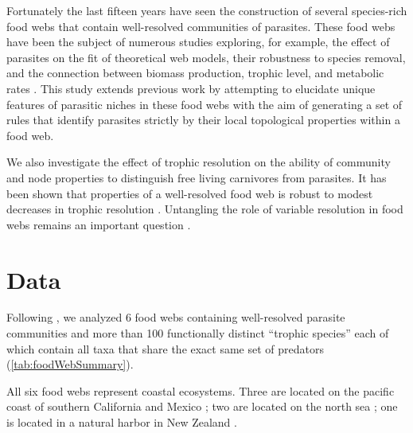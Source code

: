 \documentclass[/home/nkappler/Research/Dissertation/dissertation.tex]{subfiles}
\begin{document}
\begin{bibunit}
Fortunately the last fifteen years have seen the construction of several
species-rich food webs that contain well-resolved communities of parasites.
These food webs have been the subject of numerous studies exploring, for
example, the effect of parasites on the fit of theoretical web models, their
robustness to species removal, and the connection between biomass production,
trophic level, and metabolic rates \cite*{Dunne2013, Lafferty2012,
Hechinger2011b}. This study extends previous work by attempting to elucidate
unique features of parasitic niches in these food webs with the aim of
generating a set of rules that identify parasites strictly by their local
topological properties within a food web.

We also investigate the effect of trophic resolution on the ability of
community and node properties to distinguish free living carnivores from
parasites. It has been shown that properties of a well-resolved food web is
robust to modest decreases in trophic resolution \cite*{Martinez1991}.
Untangling the role of variable resolution in food webs remains an important
question \cite*{Martinez1999}.

\section{Data} 
Following \cite*{Dunne2013}, we analyzed 6 food webs containing well-resolved
parasite communities and more than 100 functionally distinct ``trophic
species'' each of which contain all taxa that share the exact same set of
predators (\ref{tab:foodWebSummary}).


All six food webs represent coastal ecosystems. Three are located on the pacific
coast of southern California and Mexico \cite*{Hechinger2011a}; two are located
on the north sea \cite*{Thieltges2011,Zander2011}; one is located in a 
natural harbor in New Zealand \cite*{Mouritsen2011}. 



\end{bibunit}
\end{document}
